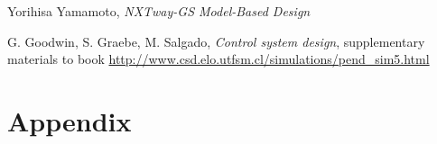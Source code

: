 \documentclass[conference]{IEEEtran}
\begin{document}
\begin{thebibliography}{9}
    
    Yorihisa Yamamoto, \emph{NXTway-GS Model-Based Design} 
    
     G. Goodwin, S. Graebe, M. Salgado, \emph{Control system design}, supplementary materials to book \url{http://www.csd.elo.utfsm.cl/simulations/pend_sim5.html}
    
\end{thebibliography}


\section{Appendix}
\label{sec:simulink_nelin_model}
\end{document}
